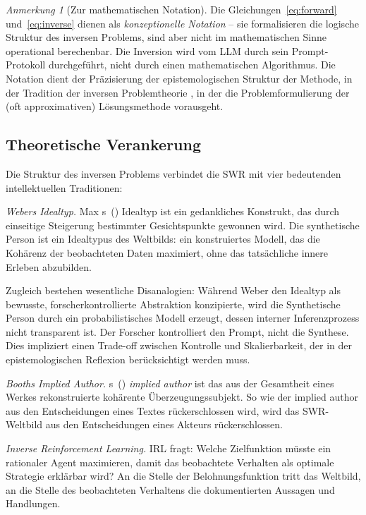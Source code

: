\documentclass[11pt,a4paper]{article}
\theoremstyle{definition}
\theoremstyle{plain}
\theoremstyle{remark}
\newtheorem{anmerkung}{Anmerkung}[section]
\begin{document}
\begin{anmerkung}[Zur mathematischen Notation]
Die Gleichungen~\eqref{eq:forward} und~\eqref{eq:inverse} dienen als \emph{konzeptionelle Notation} -- sie formalisieren die logische Struktur des inversen Problems, sind aber nicht im mathematischen Sinne operational berechenbar. Die \glqq Inversion\grqq{} wird vom LLM durch sein Prompt-Protokoll durchgef\"uhrt, nicht durch einen mathematischen Algorithmus. Die Notation dient der Pr\"azisierung der epistemologischen Struktur der Methode, in der Tradition der inversen Problemtheorie \citep{Tarantola2005}, in der die Problemformulierung der (oft approximativen) L\"osungsmethode vorausgeht.
\end{anmerkung}


\subsection{Theoretische Verankerung}
\label{sec:verankerung}

Die Struktur des inversen Problems verbindet die SWR mit vier bedeutenden intellektuellen Traditionen:

\emph{Webers Idealtyp.} Max \citeauthor{Weber1904}s~(\citeyear{Weber1904}) Idealtyp ist ein gedankliches Konstrukt, das durch einseitige Steigerung bestimmter Gesichtspunkte gewonnen wird. Die synthetische Person ist ein Idealtypus des Weltbilds: ein konstruiertes Modell, das die Koh\"arenz der beobachteten Daten maximiert, ohne das tats\"achliche innere Erleben abzubilden.

Zugleich bestehen wesentliche Disanalogien: W\"ahrend Weber den Idealtyp als bewusste, forscherkontrollierte Abstraktion konzipierte, wird die Synthetische Person durch ein probabilistisches Modell erzeugt, dessen interner Inferenzprozess nicht transparent ist. Der Forscher kontrolliert den Prompt, nicht die Synthese. Dies impliziert einen Trade-off zwischen Kontrolle und Skalierbarkeit, der in der epistemologischen Reflexion ber\"ucksichtigt werden muss.

\emph{Booths Implied Author.} \citeauthor{Booth1961}s~(\citeyear{Booth1961}) \emph{implied author} ist das aus der Gesamtheit eines Werkes rekonstruierte koh\"arente \"Uberzeugungssubjekt. So wie der implied author aus den Entscheidungen eines Textes r\"uckerschlossen wird, wird das SWR-Weltbild aus den Entscheidungen eines Akteurs r\"uckerschlossen.

\emph{Inverse Reinforcement Learning.} IRL \citep{NgRussell2000} fragt: Welche Zielfunktion m\"usste ein rationaler Agent maximieren, damit das beobachtete Verhalten als optimale Strategie erkl\"arbar wird? An die Stelle der Belohnungsfunktion tritt das Weltbild, an die Stelle des beobachteten Verhaltens die dokumentierten Aussagen und Handlungen.
\end{document}
